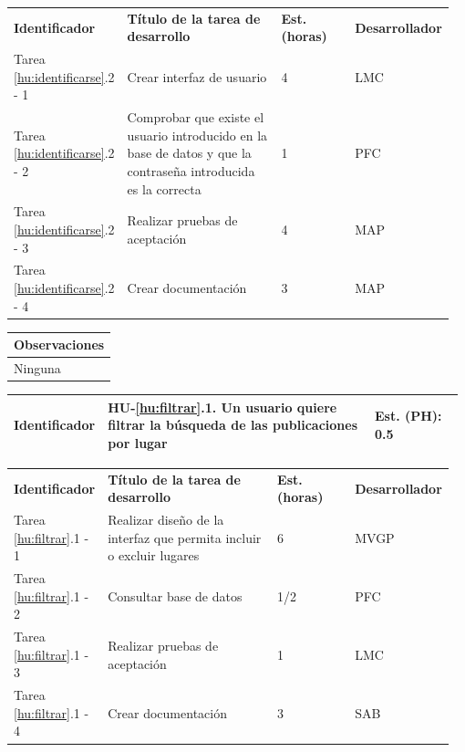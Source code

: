 \documentclass[11pt]{article}
\begin{document}
\begin{longtable}{p{0.18\linewidth}|p{0.4\linewidth}|p{0.18\linewidth}|p{0.2\linewidth}}
	\toprule
	\textbf{Identificador} & \textbf{Título de la tarea de desarrollo} & \textbf{Est. (horas)} & \textbf{Desarrollador} \\
        Tarea \ref{hu:identificarse}.2 - 1 & Crear interfaz de usuario & 4 & LMC\\
        Tarea \ref{hu:identificarse}.2 - 2 & Comprobar que existe el usuario introducido en la base de datos y que la contraseña introducida es la correcta & 1 & PFC \\
        Tarea \ref{hu:identificarse}.2 - 3 & Realizar pruebas de aceptación & 4 & MAP\\
       	Tarea \ref{hu:identificarse}.2 - 4 & Crear documentación & 3 & MAP\\
	\bottomrule
\end{longtable}


\begin{longtable}{p{1.028\linewidth}}
	\textbf{Observaciones}\\
	\midrule
	Ninguna\\
	\bottomrule
	\bottomrule
\end{longtable}

\centering
\begin{longtable}{p{0.18\linewidth}|p{0.6\linewidth}|p{0.2\linewidth}}
	\toprule
	\toprule
	\textbf{Identificador} & \textbf{HU-\ref{hu:filtrar}.1}.  Un usuario quiere filtrar la búsqueda de las publicaciones por lugar & \textbf{Est. (PH):} 0.5 \\
	
	\bottomrule
\end{longtable}

\begin{longtable}{p{0.18\linewidth}|p{0.4\linewidth}|p{0.18\linewidth}|p{0.2\linewidth}}
	\toprule
	\textbf{Identificador} & \textbf{Título de la tarea de desarrollo} & \textbf{Est. (horas)} & \textbf{Desarrollador} \\
	Tarea \ref{hu:filtrar}.1 - 1 & Realizar diseño de la interfaz que permita incluir o excluir lugares & 6 & MVGP\\
	Tarea \ref{hu:filtrar}.1 - 2 & Consultar base de datos & 1/2 & PFC\\
	Tarea \ref{hu:filtrar}.1 - 3 & Realizar pruebas de aceptación & 1 & LMC \\
	Tarea \ref{hu:filtrar}.1 - 4 & Crear documentación & 3 & SAB\\
	\bottomrule
\end{longtable}
\end{document}
